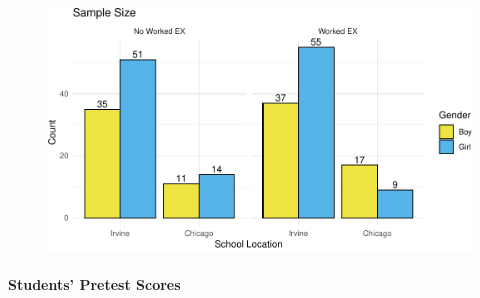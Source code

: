 \documentclass[
  letterpaper,
  DIV=11,
  numbers=noendperiod]{scrartcl}
\let\oldparagraph\paragraph
\renewcommand{\paragraph}[1]{\oldparagraph{#1}\mbox{}}
\begin{document}
\begin{figure}[H]

{\centering \includegraphics{sampling_files/figure-pdf/unnamed-chunk-10-1.pdf}

}

\end{figure}

\hypertarget{students-pretest-scores}{%
\paragraph{Students' Pretest Scores}\label{students-pretest-scores}}
\end{document}
